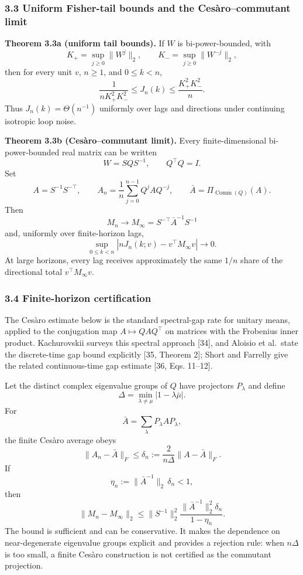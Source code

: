 \documentclass[
  10pt,
]{article}
\begin{document}
\subsubsection{3.3 Uniform Fisher-tail bounds and the Cesàro--commutant
limit}\label{uniform-fisher-tail-bounds-and-the-cesuxe0rocommutant-limit}

\textbf{Theorem 3.3a (uniform tail bounds).} If \(W\) is
bi-power-bounded, with \[
K_+=\sup_{j\ge0}\|W^j\|_2,\qquad K_-=\sup_{j\ge0}\|W^{-j}\|_2,
\] then for every unit \(v\), \(n\ge1\), and \(0\le k<n\), \[
\boxed{\frac{1}{nK_+^2K_-^2}\le J_n(k)\le\frac{K_+^2K_-^2}{n}.}
\] Thus \(J_n(k)=\Theta(n^{-1})\) uniformly over lags and directions
under continuing isotropic loop noise.

\textbf{Theorem 3.3b (Cesàro--commutant limit).} Every
finite-dimensional bi-power-bounded real matrix can be written \[
W=SQS^{-1},\qquad Q^\top Q=I.
\] Set \[
A=S^{-1}S^{-\top},\qquad
A_n=\frac1n\sum_{j=0}^{n-1}Q^jAQ^{-j},\qquad
\bar A=\Pi_{\operatorname{Comm}(Q)}(A).
\] Then \[
\boxed{M_n\longrightarrow M_\infty=S^{-\top}\bar A^{-1}S^{-1}}
\] and, uniformly over finite-horizon lags, \[
\boxed{\sup_{0\le k<n}\left|nJ_n(k;v)-v^\top M_\infty v\right|\longrightarrow0.}
\] At large horizons, every lag receives approximately the same \(1/n\)
share of the directional total \(v^\top M_\infty v\).

\subsubsection{3.4 Finite-horizon
certification}\label{finite-horizon-certification}

The Cesàro estimate below is the standard spectral-gap rate for unitary
means, applied to the conjugation map \(A\mapsto QAQ^\top\) on matrices
with the Frobenius inner product. Kachurovskii surveys this spectral
approach {[}34{]}, and Aloisio et al.~state the discrete-time gap bound
explicitly {[}35, Theorem 2{]}; Short and Farrelly give the related
continuous-time gap estimate {[}36, Eqs. 11--12{]}.

Let the distinct complex eigenvalue groups of \(Q\) have projectors
\(P_\lambda\) and define \[
\Delta=\min_{\lambda\ne\mu}|1-\lambda\bar\mu|.
\] For \[
\bar A=\sum_\lambda P_\lambda A P_\lambda,
\] the finite Cesàro average obeys \[
\boxed{
\|A_n-\bar A\|_F
\le
\delta_n
:=
\frac{2}{n\Delta}\|A-\bar A\|_F .
}
\] If \[
\eta_n:=\|\bar A^{-1}\|_2\,\delta_n<1,
\] then \[
\boxed{
\|M_n-M_\infty\|_2
\le
\|S^{-1}\|_2^2
\frac{\|\bar A^{-1}\|_2^2\delta_n}{1-\eta_n}.
}
\] The bound is sufficient and can be conservative. It makes the
dependence on near-degenerate eigenvalue groups explicit and provides a
rejection rule: when \(n\Delta\) is too small, a finite Cesàro
construction is not certified as the commutant projection.
\end{document}
